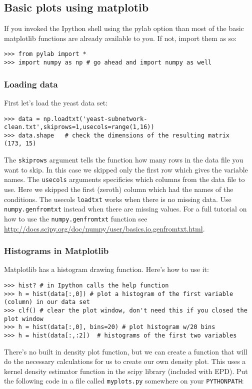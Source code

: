 \subsection{Basic plots using matplotib}

If you invoked the Ipython shell using the pylab option than most of the
basic matplotlib functions are already available to you. If not, import
them as so:

\begin{lstlisting}
>>> from pylab import *
>>> import numpy as np # go ahead and import numpy as well
\end{lstlisting}
\subsubsection{Loading data}

First let's load the yeast data set:

\begin{lstlisting}
>>> data = np.loadtxt('yeast-subnetwork-clean.txt',skiprows=1,usecols=range(1,16))
>>> data.shape   # check the dimensions of the resulting matrix
(173, 15)
\end{lstlisting}
The \lstinline!skiprows! argument tells the function how many rows in
the data file you want to skip. In this case we skipped only the first
row which gives the variable names. The \lstinline!usecols! arguments
specificies which columns from the data file to use. Here we skipped the
first (zeroth) column which had the names of the conditions. The usecols
\lstinline!loadtxt! works when there is no missing data. Use
\lstinline!numpy.genfromtxt! instead when there are missing values. For
a full tutorial on how to use the \lstinline!numpy.genfromtxt! function
see
\url{http://docs.scipy.org/doc/numpy/user/basics.io.genfromtxt.html}.

\subsubsection{Histograms in Matplotlib}

Matplotlib has a histogram drawing function. Here's how to use it:

\begin{lstlisting}
>>> hist? # in Ipython calls the help function
>>> h = hist(data[:,0]) # plot a histogram of the first variable (column) in our data set
>>> clf() # clear the plot window, don't need this if you closed the plot window
>>> h = hist(data[:,0], bins=20) # plot histogram w/20 bins
>>> h = hist(data[:,:2])  # histograms of the first two variables    
\end{lstlisting}
There's no built in density plot function, but we can create a function
that will do the necessary calculations for us to create our own density
plot. This uses a kernel density estimator function in the scipy library
(included with EPD). Put the following code in a file called
\lstinline!myplots.py! somewhere on your \lstinline!PYTHONPATH!:


